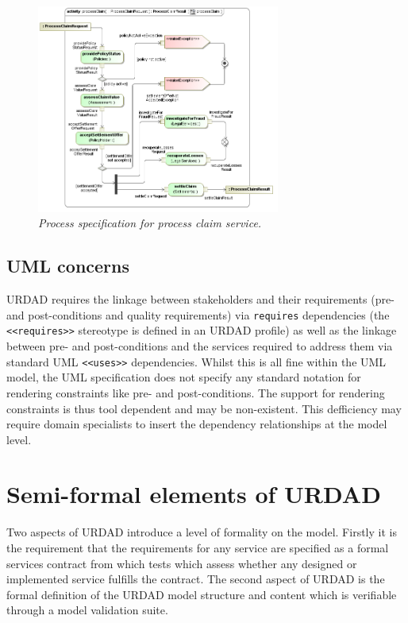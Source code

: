 \begin{figure}[ht!]
  \begin{center}
    \includegraphics[width=8cm]{processClaim}
    \caption{\it Process specification for process claim service.}
    \label{fig:processClaim}
  \end{center}
\end{figure}




\subsection{UML concerns}

URDAD requires the linkage between stakeholders and their requirements 
(pre- and post-conditions and quality requirements) via \verb+requires+
dependencies (the \verb+<<requires>>+ stereotype is defined in an URDAD 
profile) as well as the linkage between
pre- and post-conditions and the services required to address them via
standard UML \verb+<<uses>>+ dependencies. Whilst this is all fine within the
UML model, the UML specification does not specify any standard notation
for rendering constraints like pre- and post-conditions. The support for
rendering constraints is thus tool dependent and may be non-existent.
This defficiency may require domain specialists to insert the dependency
relationships at the model level.


\section{Semi-formal elements of URDAD}
\label{sec:semiFormalElements}

Two aspects of URDAD introduce a level of formality on the model. Firstly it is the 
requirement that the 
requirements for any service are specified as a formal services contract from which tests which
assess whether any designed or implemented service fulfills the contract. The second aspect
of URDAD is the
formal definition of the URDAD model structure and content which is verifiable through a model 
validation suite.




